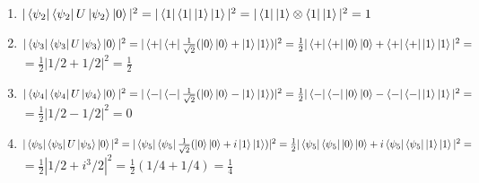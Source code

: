 \documentclass[12pt]{article}
\begin{document}
\begin{enumerate}
\begin{enumerate}
\begin{enumerate}
    \item $|\bra{\psi_2}\bra{\psi_2}U\ket{\psi_2} \ket{0}|^2 = |\bra{1}\bra{1}\ket{1}\ket{1}|^2 = |\bra{1}\ket{1}\otimes \bra{1}\ket{1}|^2 = 1 $

    \item $|\bra{\psi_3}\bra{\psi_3}U\ket{\psi_3} \ket{0}|^2 = |\bra{+}\bra{+}\frac{1}{\sqrt{2}}(\ket{0}\ket{0} + \ket{1}\ket{1})|^2 = \frac{1}{2}|\bra{+}\bra{+}\ket{0}\ket{0} + \bra{+}\bra{+}\ket{1}\ket{1}|^2 = $\\
    $= \frac{1}{2}|1/2 + 1/2|^2 = \frac{1}{2}$
    
    \item $|\bra{\psi_4}\bra{\psi_4}U\ket{\psi_4} \ket{0}|^2 = |\bra{-}\bra{-}\frac{1}{\sqrt{2}}(\ket{0}\ket{0} - \ket{1}\ket{1})|^2 = \frac{1}{2}|\bra{-}\bra{-}\ket{0}\ket{0} - \bra{-}\bra{-}\ket{1}\ket{1}|^2 = $\\
    $= \frac{1}{2}|1/2 - 1/2|^2 = 0$
    
    \item $|\bra{\psi_5}\bra{\psi_5}U\ket{\psi_5} \ket{0}|^2 = |\bra{\psi_5}\bra{\psi_5}\frac{1}{\sqrt{2}}(\ket{0}\ket{0} + i\ket{1}\ket{1})|^2 = \frac{1}{2}|\bra{\psi_5}\bra{\psi_5}\ket{0}\ket{0} + i\bra{\psi_5}\bra{\psi_5}\ket{1}\ket{1}|^2 = $\\
    $= \frac{1}{2}|1/2 + i^3/2|^2 = \frac{1}{2}(1/4+1/4) = \frac{1}{4}$    


\end{enumerate}
\end{enumerate}
\end{enumerate}
\end{document}
